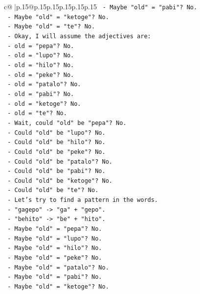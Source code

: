 \documentclass{article}
\begin{document}
{\begin{supertabular}{c@{$\;$}|p{.15\linewidth}@{}p{.15\linewidth}p{.15\linewidth}p{.15\linewidth}p{.15\linewidth}p{.15\linewidth}}
{{{\texttt{      {-} Maybe "old" = "pabi"? No.} \\
\texttt{      {-} Maybe "old" = "ketoge"? No.} \\
\texttt{      {-} Maybe "old" = "te"? No.} \\
\texttt{      {-} Okay, I will assume the adjectives are:} \\
\texttt{        {-} old = "pepa"? No.} \\
\texttt{        {-} old = "lupo"? No.} \\
\texttt{        {-} old = "hilo"? No.} \\
\texttt{        {-} old = "peke"? No.} \\
\texttt{        {-} old = "patalo"? No.} \\
\texttt{        {-} old = "pabi"? No.} \\
\texttt{        {-} old = "ketoge"? No.} \\
\texttt{        {-} old = "te"? No.} \\
\texttt{      {-} Wait, could "old" be "pepa"? No.} \\
\texttt{      {-} Could "old" be "lupo"? No.} \\
\texttt{      {-} Could "old" be "hilo"? No.} \\
\texttt{      {-} Could "old" be "peke"? No.} \\
\texttt{      {-} Could "old" be "patalo"? No.} \\
\texttt{      {-} Could "old" be "pabi"? No.} \\
\texttt{      {-} Could "old" be "ketoge"? No.} \\
\texttt{      {-} Could "old" be "te"? No.} \\
\texttt{      {-} Let's try to find a pattern in the words.} \\
\texttt{      {-} "gagepo" {-}> "ga" + "gepo".} \\
\texttt{      {-} "behito" {-}> "be" + "hito".} \\
\texttt{      {-} Maybe "old" = "pepa"? No.} \\
\texttt{      {-} Maybe "old" = "lupo"? No.} \\
\texttt{      {-} Maybe "old" = "hilo"? No.} \\
\texttt{      {-} Maybe "old" = "peke"? No.} \\
\texttt{      {-} Maybe "old" = "patalo"? No.} \\
\texttt{      {-} Maybe "old" = "pabi"? No.} \\
\texttt{      {-} Maybe "old" = "ketoge"? No.} \\
}}}
\end{supertabular}}
\end{document}
